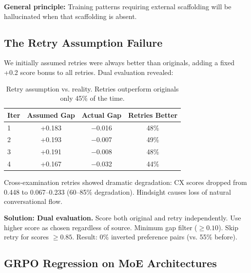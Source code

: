 \textbf{General principle:} Training patterns requiring external
scaffolding will be hallucinated when that scaffolding is absent.

\subsection{The Retry Assumption Failure}

We initially assumed retries were always better than originals, adding
a fixed +0.2 score bonus to all retries. Dual evaluation revealed:

\begin{table}[h]
\centering
\begin{tabular}{lccc}
\toprule
\textbf{Iter} & \textbf{Assumed Gap} & \textbf{Actual Gap} & \textbf{Retries Better} \\
\midrule
1 & +0.183 & $-$0.016 & 48\% \\
2 & +0.193 & $-$0.007 & 49\% \\
3 & +0.191 & $-$0.008 & 48\% \\
4 & +0.167 & $-$0.032 & 44\% \\
\bottomrule
\end{tabular}
\caption{Retry assumption vs. reality. Retries outperform originals only 45\% of the time.}
\end{table}

Cross-examination retries showed dramatic degradation: CX scores dropped
from 0.448 to 0.067--0.233 (60--85\% degradation). Hindsight causes loss
of natural conversational flow.

\textbf{Solution: Dual evaluation.} Score both original and retry
independently. Use higher score as chosen regardless of source. Minimum
gap filter ($\geq 0.10$). Skip retry for scores $\geq 0.85$. Result:
0\% inverted preference pairs (vs. 55\% before).

\subsection{GRPO Regression on MoE Architectures}

